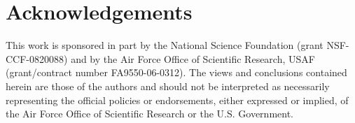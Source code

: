 \documentclass{llncs}
\begin{document}




 

 





\section{Acknowledgements}
This work is sponsored in part by the National Science Foundation 
(grant NSF-CCF-0820088) and by the Air Force Office of Scientific Research, 
USAF (grant/contract number FA9550-06-0312).  The views and conclusions 
contained herein are those of the authors and should not be interpreted as 
necessarily representing the official policies or endorsements, either 
expressed or implied, of the Air Force Office of Scientific Research or the 
U.S. Government.


%



\end{document}
